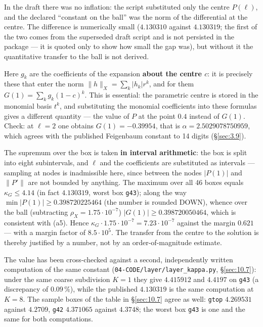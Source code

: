 In the draft there was no inflation: the script substituted only the centre
$P(\ell)$, and the declared ``constant on the ball'' was the norm of the
differential at the centre. The difference is numerically small ($4.130310$
against $4.130319$; the first of the two comes from the superseded draft script
and is not persisted in the package --- it is quoted only to show how small the
gap was), but without it the quantitative transfer to the ball is
not derived.

Here $g_k$ are the coefficients of the expansion \textbf{about the centre
$c$}: it is precisely these that enter the norm $\|h\|_X=\sum_k|h_k|r^k$, and
for them $G(1)=\sum_k g_k(1-c)^k$. This is essential: the parametric centre is
stored in the monomial basis $t^k$, and substituting the monomial
coefficients into these formulas gives a different quantity --- the value of
$P$ at the point $0.4$ instead of $G(1)$. Check: at $\ell=2$ one obtains
$G(1)=-0.39954$, that is $\alpha=2.5029078750959$, which agrees with the
published Feigenbaum constant to 14 digits (\S\ref{sec:3.9}).

The supremum over the box is taken \textbf{in interval arithmetic}: the box
is split into eight subintervals, and $\ell$ and the coefficients are
substituted as intervals --- sampling at nodes is inadmissible here, since
between the nodes $|P(1)|$ and $\|P'\|$ are not bounded by anything. The
maximum over all 46 boxes equals $\kappa_G\le4.14$ (in fact $4.130319$,
worst box \texttt{g43}); along the way $\min|P(1)|\ge0.398720225464$ (the
number is rounded DOWN), whence over the ball (subtracting
$\rho_X=1.75\cdot10^{-7}$) $|G(1)|\ge0.398720050464$, which is consistent
with (a5). Hence $\kappa_G\cdot1.75\cdot10^{-7}=7.23\cdot10^{-7}$ against the
margin $0.621$ --- with a margin factor of $8.5\cdot10^{5}$. The transfer
from the centre to the solution is thereby justified by a number, not by an
order-of-magnitude estimate.

The value has been cross-checked against a second, independently written
computation of the same constant (\texttt{04-\allowbreak CODE/\allowbreak layer/\allowbreak layer\_\allowbreak kappa.py},
\S\ref{sec:10.7}): under the same coarse subdivision $K=1$ they give $4.415912$ and
$4.4197$ on \texttt{g43} (a discrepancy of $0.09\,\%$), while the published
$4.130319$ is the same computation at $K=8$. The sample boxes of the table in
\S\ref{sec:10.7} agree as well: \texttt{gtop} $4.269531$ against $4.2709$, \texttt{g42}
$4.371065$ against $4.3748$; the worst box \texttt{g43} is one and the same
for both computations.

